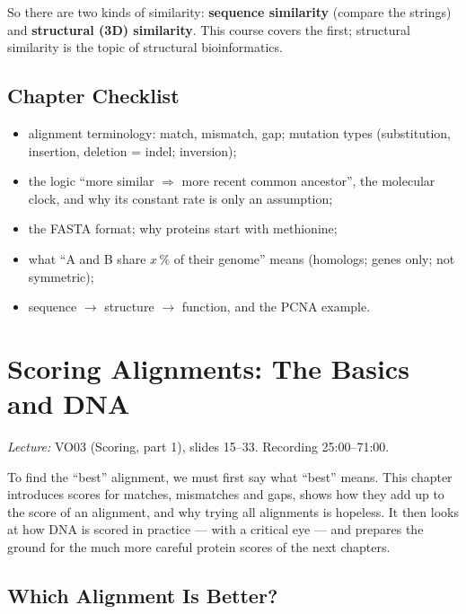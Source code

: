 \documentclass[11pt, oneside]{book}
\newcommand{\lectureref}[1]{%
  \par{\small\color{gray!70!black}\textit{Lecture:} #1}\par}
\let\originalsection\section
\renewcommand{\section}{\Needspace{7\baselineskip}\originalsection}
\begin{document}
So there are two kinds of similarity: \textbf{sequence similarity} (compare the
strings) and \textbf{structural (3D) similarity}. This course covers the
first; structural similarity is the topic of structural bioinformatics.

\section{Chapter Checklist}

\begin{itemize}
  \item alignment terminology: match, mismatch, gap; mutation types
    (substitution, insertion, deletion = indel; inversion);
  \item the logic ``more similar $\Rightarrow$ more recent common ancestor'',
    the molecular clock, and why its constant rate is only an assumption;
  \item the FASTA format; why proteins start with methionine;
  \item what ``A and B share $x\,\%$ of their genome'' means (homologs; genes
    only; not symmetric);
  \item sequence $\to$ structure $\to$ function, and the PCNA example.
\end{itemize}

\chapter{Scoring Alignments: The Basics and DNA}
\label{ch:scoring}

\lectureref{VO03 (Scoring, part 1), slides 15--33. Recording 25:00--71:00.}

To find the ``best'' alignment, we must first say what ``best'' means. This
chapter introduces scores for matches, mismatches and gaps, shows how they add
up to the score of an alignment, and why trying all alignments is hopeless.
It then looks at how DNA is scored in practice --- with a critical eye ---
and prepares the ground for the much more careful protein scores of the next
chapters.

\section{Which Alignment Is Better?}
\end{document}

